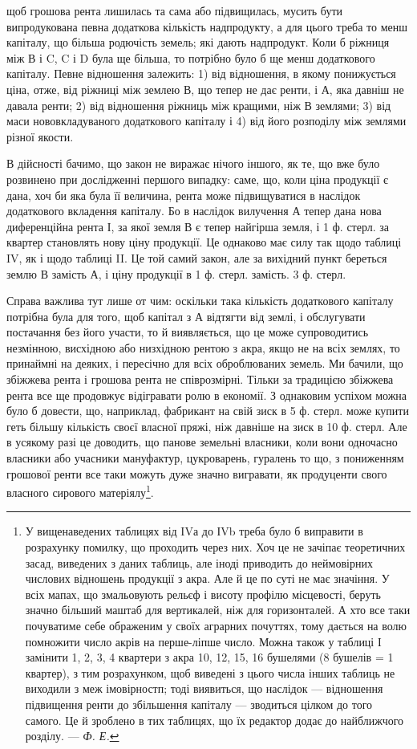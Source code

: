 \parcont{}  %
щоб грошова рента лишилась та сама або підвищилась, мусить бути випродукована
певна додаткова кількість надпродукту, а для цього треба то менш
капіталу, що більша родючість земель; які дають надпродукт. Коли б ріжниця
між В і C, C і D була ще більша, то потрібно було б ще менш додаткового
капіталу. Певне відношення залежить: 1) від відношення, в якому понижується
ціна, отже, від ріжниці між землею В, що тепер не дає ренти, і А, яка давніш
не давала ренти; 2) від відношення ріжниць між кращими, ніж В землями; 3) від
маси нововкладуваного додаткового капіталу і 4) від його розподілу між землями
різної якости.

В дійсності бачимо, що закон не виражає нічого іншого, як те, що вже
було розвинено при дослідженні першого випадку: саме, що, коли ціна продукції
є дана, хоч би яка була її величина, рента може підвищуватися в наслідок
додаткового вкладення капіталу. Бо в наслідок вилучення А тепер дана нова диференційна
рента І, за якої земля В є тепер найгірша земля, і 1 ф. стерл. за
квартер становлять нову ціну продукції. Це однаково має силу так щодо таблиці
IV, як і щодо таблиці II. Це той самий закон, але за вихідний
пункт береться землю В замість А, і ціну продукції в 1  ф. стерл. замість.
3 ф. стерл.

Справа важлива тут лише от чим: оскільки така кількість додаткового
капіталу потрібна була для того, щоб капітал з А відтягти від землі, і обслугувати
постачання без його участи, то й виявляється, що це може супроводитись
незмінною, висхідною або низхідною рентою з акра, якщо не на всіх землях, то
принаймні на деяких, і пересічно для всіх оброблюваних земель. Ми бачили, що
збіжжева рента і грошова рента не співрозмірні. Тільки за традицією збіжжева
рента все ще продовжує відігравати ролю в економії. З однаковим успіхом можна
було б довести, що, наприклад, фабрикант на свій зиск в 5 ф. стерл. може купити
геть більшу кількість своєї власної пряжі, ніж давніше на зиск в 10 ф. стерл.
Але в усякому разі це доводить, що панове земельні власники, коли вони одночасно
власники або учасники мануфактур, цукроварень, гуралень то що, з пониженням
грошової ренти все таки можуть дуже значно вигравати, як продуценти
свого власного сирового матеріялу\footnote{
У вищенаведених таблицях від IVа до ІVb треба було б виправити в розрахунку помилку, що
проходить через них. Хоч це не зачіпає теоретичних засад, виведених з даних таблиць, але іноді
приводить до неймовірних числових відношень продукції з акра. Але й це по суті не має значіння. У
всіх мапах, що змальовують рельєф і висоту профілю місцевості, беруть значно більший маштаб для
вертикалей, ніж для горизонталей. А хто все таки почуватиме себе ображеним у своїх аграрних
почуттях, тому дається на волю помножити число акрів на перше-ліпше число. Можна також у таблиці І
замінити 1, 2, 3, 4 квартери з акра 10, 12, 15, 16 бушелями (8 бушелів = 1 квартер), з тим
розрахунком, щоб виведені з цього числа інших таблиць не виходили з меж імовірностп; тоді виявиться,
що наслідок — відношення підвищення ренти до збільшення капіталу — зводиться цілком до того самого.
Це й зроблено в тих таблицях, що їх редактор додає до найближчого розділу. —\emph{ Ф. Е.}
}.

